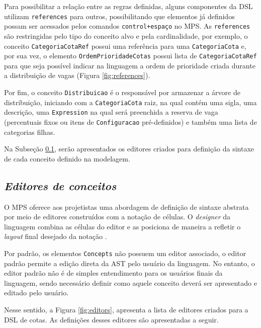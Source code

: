 Para possibilitar a relação entre as regras definidas, alguns componentes da \gls{DSL} utilizam \texttt{references} para outros, possibilitando que elementos já definidos possam ser acessados pelos comandos \texttt{control+espaço} no \gls{MPS}. As \texttt{references} são restringidas pelo tipo do conceito alvo e pela cardinalidade, por exemplo, o conceito \texttt{CategoriaCotaRef} possui uma referência para uma \texttt{CategoriaCota} e, por sua vez, o elemento \texttt{OrdemPrioridadeCotas} possui lista de \texttt{CategoriaCotaRef} para que seja possível indicar na linguagem a ordem de prioridade criada durante a distribuição de vagas (Figura \ref{fig:references}).



\newpage
Por fim, o conceito \texttt{Distribuicao} é o responsável por armazenar a árvore de distribuição, iniciando com a \texttt{CategoriaCota} raiz, na qual contém uma sigla, uma descrição, uma \texttt{Expression} na qual será preenchida a reserva de vaga (percentuais fixos ou itens de \texttt{Configuracao} pré-definidos) e também uma lista de categorias filhas. 

Na Subseção \ref{sub:sec:editores}, serão apresentados os editores criados para definição da sintaxe de cada conceito definido na modelagem.


\subsection{\textit{Editores de conceitos}}
\label{sub:sec:editores}
O \gls{MPS} oferece aos projetistas uma abordagem de definição de sintaxe abstrata por meio de editores construídos com a notação de células. O \textit{designer} da linguagem combina as células do editor e as posiciona de maneira a refletir o \textit{layout} final desejado da notação \cite{jetbrains}. 

Por padrão, os elementos \texttt{Concepts} não possuem um editor associado, o editor padrão permite a edição direta da \gls{AST} pelo usuário da linguagem. No entanto, o editor padrão não é de simples entendimento para os usuários finais da linguagem, sendo necessário definir como aquele conceito deverá ser apresentado e editado pelo usuário.

Nesse sentido, a Figura \ref{fig:editors}, apresenta a lista de editores criados para a DSL de cotas. As definições desses editores são apresentadas a seguir.




